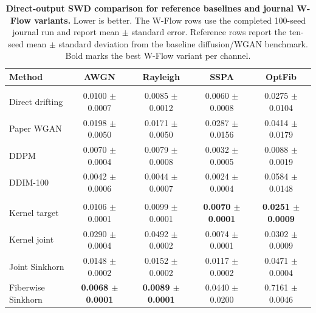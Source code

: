 \begin{table}[t]
\centering
\caption{\textbf{Direct-output SWD comparison for reference baselines and journal W-Flow variants.} Lower is better. The W-Flow rows use the completed 100-seed journal run and report mean $\pm$ standard error. Reference rows report the ten-seed mean $\pm$ standard deviation from the baseline diffusion/WGAN benchmark. Bold marks the best W-Flow variant per channel.}
\label{tab:wflow-swd-baselines}
\tablefontsize
\begin{tabular}{@{}lcccc@{}}
\toprule
Method & AWGN & Rayleigh & SSPA & OptFib \\
\midrule
\rowcolor[gray]{0.9} \multicolumn{5}{l}{\textit{Reference baselines}} \\
\headspace Direct drifting & 0.0100 $\pm$ 0.0007 & 0.0085 $\pm$ 0.0012 & 0.0060 $\pm$ 0.0008 & 0.0275 $\pm$ 0.0104 \\
\headspace Paper WGAN & 0.0198 $\pm$ 0.0050 & 0.0171 $\pm$ 0.0050 & 0.0287 $\pm$ 0.0156 & 0.0414 $\pm$ 0.0179 \\
\headspace DDPM & 0.0070 $\pm$ 0.0004 & 0.0079 $\pm$ 0.0008 & 0.0032 $\pm$ 0.0005 & 0.0088 $\pm$ 0.0019 \\
\headspace DDIM-100 & 0.0042 $\pm$ 0.0006 & 0.0044 $\pm$ 0.0007 & 0.0024 $\pm$ 0.0004 & 0.0584 $\pm$ 0.0148 \\
\midrule
\rowcolor[gray]{0.9} \multicolumn{5}{l}{\textit{100-seed W-Flow variants}} \\
\headspace Kernel target & 0.0106 $\pm$ 0.0001 & 0.0099 $\pm$ 0.0001 & \textbf{0.0070 $\pm$ 0.0001} & \textbf{0.0251 $\pm$ 0.0009} \\
\headspace Kernel joint & 0.0290 $\pm$ 0.0004 & 0.0492 $\pm$ 0.0002 & 0.0074 $\pm$ 0.0001 & 0.0302 $\pm$ 0.0009 \\
\headspace Joint Sinkhorn & 0.0148 $\pm$ 0.0002 & 0.0152 $\pm$ 0.0002 & 0.0117 $\pm$ 0.0002 & 0.0471 $\pm$ 0.0004 \\
\headspace Fiberwise Sinkhorn & \textbf{0.0068 $\pm$ 0.0001} & \textbf{0.0089 $\pm$ 0.0001} & 0.0440 $\pm$ 0.0200 & 0.7161 $\pm$ 0.0046 \\
\bottomrule
\end{tabular}
\end{table}

